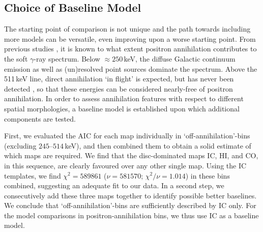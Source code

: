 \documentclass[doublespace,draft,nopageskip]{VTthesis} %
\begin{document}
	
	\subsection{Choice of Baseline Model}\label{sec:baseline_model}
	The starting point of comparison is not unique and the path towards including more models can be versatile, even improving upon a worse starting point.
	From previous studies \citep[e.g.,][]{Strong2005_gammaconti,Bouchet2011_diffuseCR,Churazov2011_511}, it is known to what extent positron annihilation contributes to the soft $\gamma$-ray spectrum.
	Below $\approx 250$\,keV, the diffuse Galactic continuum emission as well as (un)resolved point sources dominate the spectrum.
	Above the 511\,keV line, direct annihilation `in flight' is expected, but has never been detected \citep[e.g.,][]{Beacom2006_511,Sizun2006_511,Churazov2011_511}, so that these energies can be considered nearly-free of positron annihilation.
	In order to assess annihilation features with respect to different spatial morphologies, a baseline model is established upon which additional components are tested. 
	
	
	First, we evaluated the AIC for each map individually in `off-annihilation'-bins (excluding $245$--$514$\,keV), and then combined them to obtain a solid estimate of which maps are required.
	We find that the disc-dominated maps IC, HI, and CO, in this sequence, are clearly favoured over any other single map.
	Using the IC templates, we find  $\chi^2 = 589861$ ($\nu = 581570$; $\chi^2/\nu = 1.014$) in these bins combined, suggesting an adequate fit to our data.
	In a second step, we consecutively add these three maps together to identify possible better baselines.
	We conclude that `off-annihilation'-bins are sufficiently described by IC only.
	For the model comparisons in positron-annihilation bins, we thus use IC as a baseline model.
	
\end{document}
